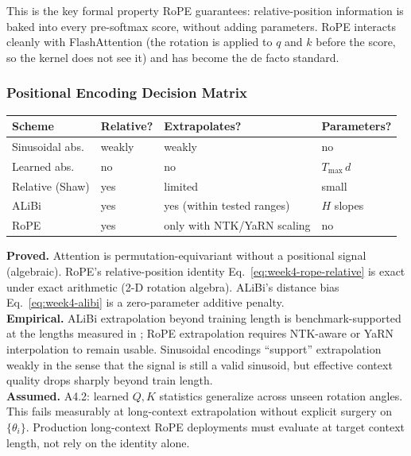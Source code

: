 This is the key formal property RoPE guarantees: relative-position
information is baked into every pre-softmax score, without adding
parameters. RoPE interacts cleanly with FlashAttention (the rotation
is applied to $q$ and $k$ before the score, so the kernel does not
see it) and has become the de facto standard.

\subsubsection{Positional Encoding Decision Matrix}

\begin{center}
\begin{tabular}{|l|l|l|l|}
\hline
Scheme & Relative? & Extrapolates? & Parameters? \\
\hline
Sinusoidal abs. & weakly & weakly  & no \\
Learned abs.    & no     & no      & $T_{\max}\,d$ \\
Relative (Shaw) & yes    & limited & small \\
ALiBi           & yes    & yes (within tested ranges) & $H$ slopes \\
RoPE            & yes    & only with NTK/YaRN scaling & no \\
\hline
\end{tabular}
\end{center}

\begin{provedassumed}
\textbf{Proved.} Attention is permutation-equivariant without a
positional signal (algebraic). RoPE's relative-position identity
Eq.~\eqref{eq:week4-rope-relative} is exact under exact arithmetic
(2-D rotation algebra). ALiBi's distance bias
Eq.~\eqref{eq:week4-alibi} is a zero-parameter additive penalty. \\
\textbf{Empirical.} ALiBi extrapolation beyond training length is
benchmark-supported at the lengths measured in
\citet{press2022alibi}; RoPE extrapolation requires NTK-aware or YaRN
interpolation to remain usable. Sinusoidal encodings ``support''
extrapolation weakly in the sense that the signal is still a valid
sinusoid, but effective context quality drops sharply beyond train
length. \\
\textbf{Assumed.} A4.2: learned $Q,K$ statistics generalize across
unseen rotation angles. This fails measurably at long-context
extrapolation without explicit surgery on $\{\theta_i\}$. Production
long-context RoPE deployments must evaluate at target context
length, not rely on the identity alone.
\end{provedassumed}

